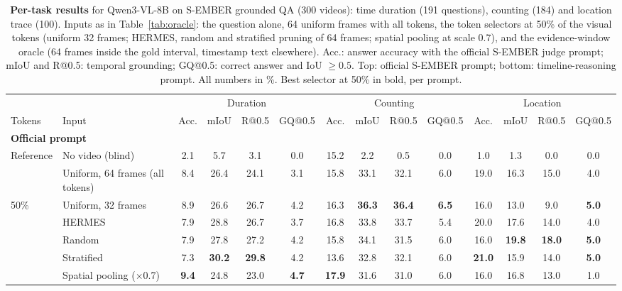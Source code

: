 \begin{table}[t]
\centering
\small
\setlength{\tabcolsep}{3.2pt}
\caption{\textbf{Per-task results} for Qwen3-VL-8B on S-EMBER grounded QA (300 videos): time duration (191 questions), counting (184) and location trace (100). Inputs as in Table~\ref{tab:oracle}: the question alone, 64 uniform frames with all tokens, the token selectors at 50\% of the visual tokens (uniform 32 frames; HERMES, random and stratified pruning of 64 frames; spatial pooling at scale 0.7), and the evidence-window oracle (64 frames inside the gold interval, timestamp text elsewhere). Acc.: answer accuracy with the official S-EMBER judge prompt; mIoU and R@0.5: temporal grounding; GQ@0.5: correct answer and IoU $\geq 0.5$. Top: official S-EMBER prompt; bottom: timeline-reasoning prompt. All numbers in \%. Best selector at 50\% in bold, per prompt.}
\label{tab:tasks}
\begin{tabular}{llcccccccccccc}
\toprule
& & \multicolumn{4}{c}{Duration} & \multicolumn{4}{c}{Counting} & \multicolumn{4}{c}{Location} \\
\cmidrule(lr){3-6} \cmidrule(lr){7-10} \cmidrule(lr){11-14}
Tokens & Input & Acc. & mIoU & R@0.5 & GQ@0.5 & Acc. & mIoU & R@0.5 & GQ@0.5 & Acc. & mIoU & R@0.5 & GQ@0.5 \\
\midrule
\multicolumn{14}{l}{\textbf{Official prompt}} \\
\multirow{2}{*}{Reference} & No video (blind) & 2.1 & 5.7 & 3.1 & 0.0 & 15.2 & 2.2 & 0.5 & 0.0 & 1.0 & 1.3 & 0.0 & 0.0 \\
 & Uniform, 64 frames (all tokens) & 8.4 & 26.4 & 24.1 & 3.1 & 15.8 & 33.1 & 32.1 & 6.0 & 19.0 & 16.3 & 15.0 & 4.0 \\
\cmidrule(lr){1-14}
\multirow{5}{*}{50\%} & Uniform, 32 frames & 8.9 & 26.6 & 26.7 & 4.2 & 16.3 & \textbf{36.3} & \textbf{36.4} & \textbf{6.5} & 16.0 & 13.0 & 9.0 & \textbf{5.0} \\
 & HERMES & 7.9 & 28.8 & 26.7 & 3.7 & 16.8 & 33.8 & 33.7 & 5.4 & 20.0 & 17.6 & 14.0 & 4.0 \\
 & Random & 7.9 & 27.8 & 27.2 & 4.2 & 15.8 & 34.1 & 31.5 & 6.0 & 16.0 & \textbf{19.8} & \textbf{18.0} & \textbf{5.0} \\
 & Stratified & 7.3 & \textbf{30.2} & \textbf{29.8} & 4.2 & 13.6 & 32.8 & 32.1 & 6.0 & \textbf{21.0} & 15.9 & 14.0 & \textbf{5.0} \\
 & Spatial pooling ($\times$0.7) & \textbf{9.4} & 24.8 & 23.0 & \textbf{4.7} & \textbf{17.9} & 31.6 & 31.0 & 6.0 & 16.0 & 16.8 & 13.0 & 1.0 \\

\end{tabular}
\end{table}
